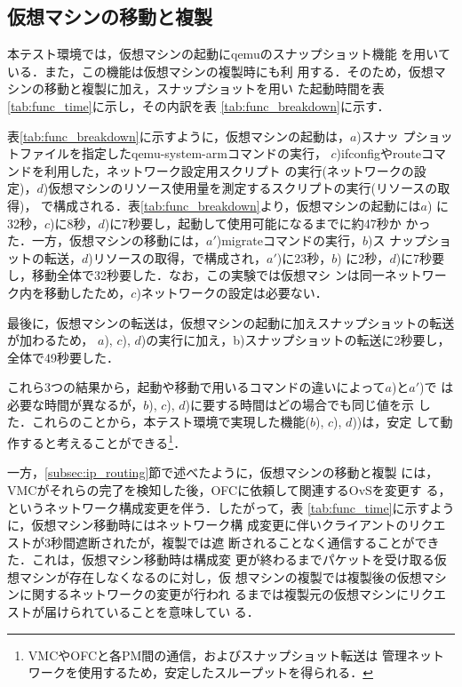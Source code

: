 \documentclass[submit,techrep]{ipsj}
\begin{document}
\subsection{仮想マシンの移動と複製}
\label{subsec:migrate_duplicate}
本テスト環境では，仮想マシンの起動にqemuのスナップショット機能
\cite{snapshot}を用いている．また，この機能は仮想マシンの複製時にも利
用する．そのため，仮想マシンの移動と複製に加え，スナップショットを用い
た起動時間を表\ref{tab:func_time}に示し，その内訳を表
\ref{tab:func_breakdown}に示す．

表\ref{tab:func_breakdown}に示すように，仮想マシンの起動は，$a$)スナッ
プショットファイルを指定したqemu-system-armコマンドの実行，
$c$)ifconfigやrouteコマンドを利用した，ネットワーク設定用スクリプト
の実行(ネットワークの設定)，$d$)仮想マシンのリソース使用量を測定するスクリプトの実行(リソースの取得)，
で構成される．表\ref{tab:func_breakdown}より，仮想マシンの起動には$a$)
に32秒，$c$)に8秒，$d$)に7秒要し，起動して使用可能になるまでに約47秒か
かった．一方，仮想マシンの移動には，$a'$)migrateコマンドの実行，$b$)ス
ナップショットの転送，$d$)リソースの取得，で構成され，$a'$)に23秒，$b$)
に2秒，$d$)に7秒要し，移動全体で32秒要した．なお，この実験では仮想マシ
ンは同一ネットワーク内を移動したため，$c$)ネットワークの設定は必要ない．

最後に，仮想マシンの転送は，仮想マシンの起動に加えスナップショットの転送が加わるため，
$a$), $c$), $d$)の実行に加え，b)スナップショットの転送に2秒要し，全体で49秒要した．

これら3つの結果から，起動や移動で用いるコマンドの違いによって$a$)と$a'$)で
は必要な時間が異なるが，$b$), $c$), $d$)に要する時間はどの場合でも同じ値を示
した．これらのことから，本テスト環境で実現した機能($b$), $c$), $d$))は，安定
して動作すると考えることができる\footnote{VMCやOFCと各PM間の通信，およびスナップショット転送は
管理ネットワークを使用するため，安定したスループットを得られる．}．

一方，\ref{subsec:ip_routing}節で述べたように，仮想マシンの移動と複製
には，VMCがそれらの完了を検知した後，OFCに依頼して関連するOvSを変更す
る，というネットワーク構成変更を伴う．したがって，表
\ref{tab:func_time}に示すように，仮想マシン移動時にはネットワーク構
成変更に伴いクライアントのリクエストが3秒間遮断されたが，複製では遮
断されることなく通信することができた．これは，仮想マシン移動時は構成変
更が終わるまでパケットを受け取る仮想マシンが存在しなくなるのに対し，仮
想マシンの複製では複製後の仮想マシンに関するネットワークの変更が行われ
るまでは複製元の仮想マシンにリクエストが届けられていることを意味してい
る．
\end{document}
